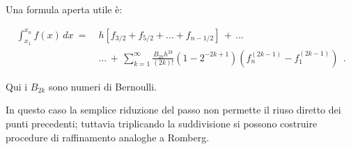 Una formula aperta utile è:

\[\begin{aligned}
	\int_{x_1}^{x_n} f(x)\,dx
	\ =\ 
	&h\left[
	f_{3/2}+f_{5/2}+\dots+f_{n-1/2}
	\right]
	\, +\, \dots\\
	&\dots \, +\, \sum_{k=1}^{\infty}
	\frac{B_{2k} h^{2k}}{(2k)!}
	\left(1-2^{-2k+1}\right)
	\left(f^{(2k-1)}_n - f^{(2k-1)}_1\right)\ \ .\end{aligned}
\]

Qui i $B_{2k}$ sono numeri di Bernoulli.

In questo caso la semplice riduzione del passo non permette il riuso diretto dei punti precedenti; tuttavia triplicando la suddivisione si possono costruire procedure di raffinamento analoghe a Romberg.
